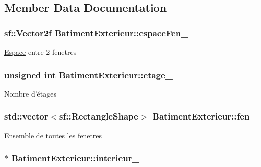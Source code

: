\subsection{Member Data Documentation}
\hypertarget{classBatimentExterieur_ada8bdedf97824310bc6464ab99f2841a}{
\subsubsection[{espace\-Fen\-\_\-}]{\setlength{\rightskip}{0pt plus 5cm}sf\-::\-Vector2f Batiment\-Exterieur\-::espace\-Fen\-\_\-\hspace{0.3cm}{\ttfamily [private]}}}\label{classBatimentExterieur_ada8bdedf97824310bc6464ab99f2841a}
\hyperlink{namespaceEspace}{Espace} entre 2 fenetres \hypertarget{classBatimentExterieur_af4fc6e80ed2a6eb26264697d9cd752a4}{
\subsubsection[{etage\-\_\-}]{\setlength{\rightskip}{0pt plus 5cm}unsigned int Batiment\-Exterieur\-::etage\-\_\-\hspace{0.3cm}{\ttfamily [private]}}}\label{classBatimentExterieur_af4fc6e80ed2a6eb26264697d9cd752a4}
Nombre d'étages \hypertarget{classBatimentExterieur_a8987b811e7ed4e6d535af016d8313a39}{
\subsubsection[{fen\-\_\-}]{\setlength{\rightskip}{0pt plus 5cm}std\-::vector$<$sf\-::\-Rectangle\-Shape$>$ Batiment\-Exterieur\-::fen\-\_\-\hspace{0.3cm}{\ttfamily [private]}}}\label{classBatimentExterieur_a8987b811e7ed4e6d535af016d8313a39}
Ensemble de toutes les fenetres \hypertarget{classBatimentExterieur_a777ffd957176d89835f51c94ee5f7c3f}{
\subsubsection[{interieur\-\_\-}]{$\ast$ Batiment\-Exterieur\-::interieur\-\_\-\hspace{0.3cm}{\ttfamily [private]}}}\label{classBatimentExterieur_a777ffd957176d89835f51c94ee5f7c3f}
